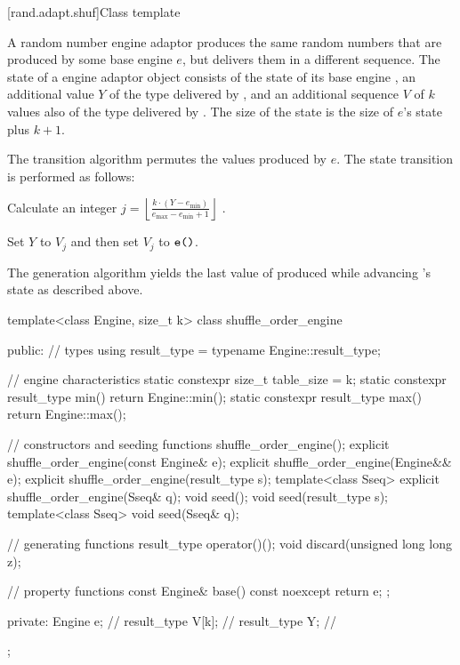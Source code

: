 [rand.adapt.shuf]{Class template }%
%

\pnum
A  random number engine adaptor
produces the same random numbers
that are produced by some base engine $e$,
but delivers them in a different sequence.
The state%
%
of a  engine adaptor object 
consists of
 the state  of its base engine ,
 an additional value $Y$ of the type delivered by ,
and
 an additional sequence $V$ of $k$ values
 also of the type delivered by .
The size of the state is
 the size of $e$'s state plus $k+1$.

\pnum
The transition algorithm%
%
permutes the values produced by $e$.
The state transition is performed as follows:
\begin{enumeratea}
 \item
   Calculate an integer
   $j = \left\lfloor \frac{k \cdot (Y - e_{\min})}
                          {e_{\max} - e_{\min} +1}
        \right\rfloor
   $%
   .
 \item
   Set $Y$ to $V_j$ and then set $V_j$ to $\texttt{\protect e()}$.
\end{enumeratea}

\pnum
The generation algorithm%
%
yields the last value of 
 produced while advancing 's state as described above.

%
\begin{codeblock}
template<class Engine, size_t k>
  class shuffle_order_engine {
  public:
    // types
    using result_type = typename Engine::result_type;

    // engine characteristics
    static constexpr size_t table_size = k;
    static constexpr result_type min() { return Engine::min(); }
    static constexpr result_type max() { return Engine::max(); }

    // constructors and seeding functions
    shuffle_order_engine();
    explicit shuffle_order_engine(const Engine& e);
    explicit shuffle_order_engine(Engine&& e);
    explicit shuffle_order_engine(result_type s);
    template<class Sseq> explicit shuffle_order_engine(Sseq& q);
    void seed();
    void seed(result_type s);
    template<class Sseq> void seed(Sseq& q);

    // generating functions
    result_type operator()();
    void discard(unsigned long long z);

    // property functions
    const Engine& base() const noexcept { return e; };

  private:
    Engine e;           // \expos
    result_type V[k];   // \expos
    result_type Y;      // \expos
  };
\end{codeblock}


